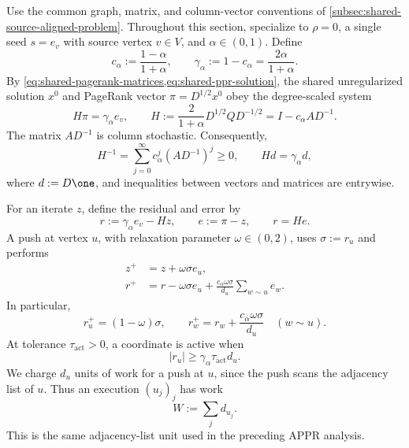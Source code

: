 Use the common graph, matrix, and column-vector conventions of
\cref{subsec:shared-source-aligned-problem}.  Throughout this section,
specialize to \(\rho=0\), a single seed \(s=e_v\) with source vertex
\(v\in V\), and \(\alpha\in(0,1)\).  Define
\begin{equation}
    c_\alpha:=\frac{1-\alpha}{1+\alpha},
    \qquad
    \gamma_\alpha:=1-c_\alpha
    =\frac{2\alpha}{1+\alpha}.
    \label{eq:cf-c-gamma}
\end{equation}
By \cref{eq:shared-pagerank-matrices,eq:shared-ppr-solution}, the shared
unregularized solution \(x^0\) and PageRank vector
\(\pi=D^{1/2}x^0\) obey the degree-scaled system
\begin{equation}
    H\pi=\gamma_\alpha e_v,
    \qquad
    H:=\frac{2}{1+\alpha}D^{1/2}QD^{-1/2}
      =I-c_\alpha A D^{-1}.
    \label{eq:cf-linear-system}
\end{equation}
The matrix \(A D^{-1}\) is column stochastic.  Consequently,
\begin{equation}
    H^{-1}=\sum_{j=0}^{\infty}c_\alpha^j(AD^{-1})^j\geq0,
    \qquad
    Hd=\gamma_\alpha d,
    \label{eq:cf-positive-inverse}
\end{equation}
where \(d:=D\one\), and inequalities between vectors and matrices are
entrywise.

For an iterate \(z\), define the residual and error by
\begin{equation}
    r:=\gamma_\alpha e_v-Hz,
    \qquad
    e:=\pi-z,
    \qquad
    r=He.
    \label{eq:cf-residual-error}
\end{equation}
A push at vertex \(u\), with relaxation parameter \(\omega\in(0,2)\), uses
\(\sigma:=r_u\) and performs
\begin{align}
    z^+&=z+\omega \sigma e_u,
    \label{eq:cf-push-z}\\
    r^+&=r-\omega \sigma e_u
          +\frac{c_\alpha\omega \sigma}{d_u}
             \sum_{w\sim u}e_w.
    \label{eq:cf-push-r}
\end{align}
In particular,
\begin{equation}
    r_u^+=(1-\omega)\sigma,
    \qquad
    r_w^+=r_w+\frac{c_\alpha\omega \sigma}{d_u}
    \quad(w\sim u).
    \label{eq:cf-push-coordinates}
\end{equation}
At tolerance \(\tau_{\mathrm{act}}>0\), a coordinate is active when
\begin{equation}
    |r_u|\geq\gamma_\alpha\tau_{\mathrm{act}} d_u.
    \label{eq:cf-active}
\end{equation}
We charge \(d_u\) units of work for a push at \(u\), since the push scans the
adjacency list of \(u\).  Thus an execution \((u_j)_j\) has work
\begin{equation}
    W:=\sum_j d_{u_j}.
    \label{eq:cf-work}
\end{equation}
This is the same adjacency-list unit used in the preceding APPR analysis.

